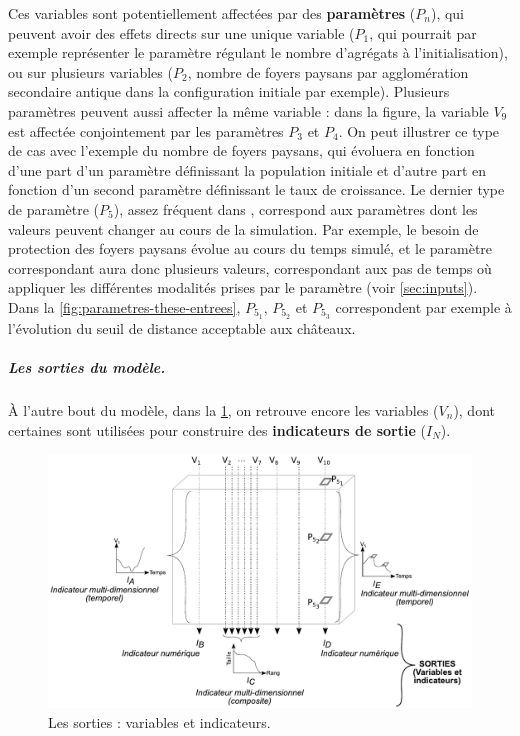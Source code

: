 Ces variables sont potentiellement affectées par des \textbf{paramètres} ($P_n$), qui peuvent avoir des effets directs sur une unique variable ($P_1$, qui pourrait par exemple représenter le paramètre régulant le nombre d'agrégats à l'initialisation), ou sur plusieurs variables ($P_2$, nombre de foyers paysans par agglomération secondaire antique dans la configuration initiale par exemple).
Plusieurs paramètres peuvent aussi affecter la même variable : dans la figure, la variable $V_9$ est affectée conjointement par les paramètres $P_3$ et $P_4$.
On peut illustrer ce type de cas avec l'exemple du nombre de foyers paysans, qui évoluera en fonction d'une part d'un paramètre définissant la population initiale et d'autre part en fonction d'un second paramètre définissant le taux de croissance.
Le dernier type de paramètre ($P_5$), assez fréquent dans \simfeodal{}, correspond aux paramètres dont les valeurs peuvent changer au cours de la simulation.
Par exemple, le besoin de protection des foyers paysans évolue au cours du temps simulé, et le paramètre correspondant aura donc plusieurs valeurs, correspondant aux pas de temps où appliquer les différentes modalités prises par le paramètre (voir \cref{sec:inputs}).
Dans la \cref{fig:parametres-these-entrees}, $P_{5_1}$, $P_{5_2}$ et $P_{5_3}$ correspondent par exemple à l'évolution du seuil de distance acceptable aux châteaux.


\subparagraph{Les sorties du modèle.}
À l'autre bout du modèle, dans la \cref{fig:parametres-these-sorties}, on retrouve encore les variables ($V_n$), dont certaines sont utilisées pour construire des \textbf{indicateurs de sortie} ($I_N$).

\begin{figure}[H]
	\includegraphics[width=\linewidth]{img/schemas_params_2_sorties.pdf}
	\caption{Les sorties : variables et indicateurs.} 
	\label{fig:parametres-these-sorties} 
\end{figure}

